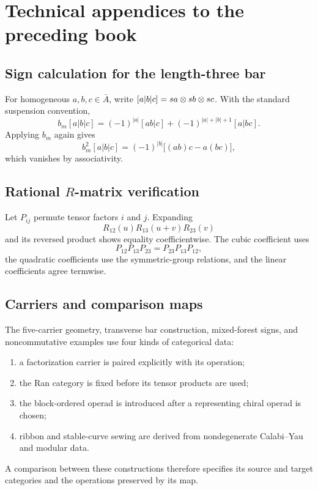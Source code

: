 \part{Technical appendices to the preceding book}
\chapter{Sign calculation for the length-three bar}
For homogeneous $a,b,c\in\bar A$, write $[a|b|c]=sa\otimes sb\otimes sc$. With the standard suspension convention,
\[
 b_m[a|b|c]
 =(-1)^{|a|}[ab|c]
 +(-1)^{|a|+|b|+1}[a|bc].
\]
Applying $b_m$ again gives
\[
 b_m^2[a|b|c]
 =(-1)^{|b|}\bigl[(ab)c-a(bc)\bigr],
\]
which vanishes by associativity.

\chapter{Rational \texorpdfstring{$R$}{R}-matrix verification}
Let $P_{ij}$ permute tensor factors $i$ and $j$. Expanding
\[
 R_{12}(u)R_{13}(u+v)R_{23}(v)
\]
and its reversed product shows equality coefficientwise. The cubic coefficient uses
\[
 P_{12}P_{13}P_{23}=P_{23}P_{13}P_{12},
\]
the quadratic coefficients use the symmetric-group relations, and the linear coefficients agree termwise.

\chapter{Carriers and comparison maps}
The five-carrier geometry, transverse bar construction, mixed-forest signs, and noncommutative examples use four kinds of categorical data:
\begin{enumerate}
\item a factorization carrier is paired explicitly with its operation;
\item the Ran category is fixed before its tensor products are used;
\item the block-ordered operad is introduced after a representing chiral operad is chosen;
\item ribbon and stable-curve sewing are derived from nondegenerate Calabi--Yau and modular data.
\end{enumerate}
A comparison between these constructions therefore specifies its source and target categories and the operations preserved by its map.
